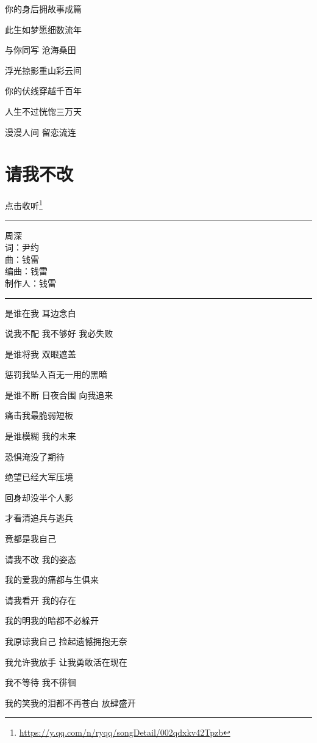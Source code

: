 \documentclass[]{ctexbook}
\renewcommand{\href}[2]{#2\footnote{\url{#1}}}
\begin{document}
你的身后拥故事成篇

此生如梦愿细数流年

与你同写 沧海桑田

浮光掠影重山彩云间

你的伏线穿越千百年

人生不过恍惚三万天

漫漫人间 留恋流连

\section*{请我不改}\label{brave-heart}


\href{https://y.qq.com/n/ryqq/songDetail/002qdxkv42Tpzb}{点击收听}

\begin{center}\rule{0.5\linewidth}{0.5pt}\end{center}

周深\\
词：尹约\\
曲：钱雷\\
编曲：钱雷\\
制作人：钱雷

\begin{center}\rule{0.5\linewidth}{0.5pt}\end{center}

是谁在我 耳边念白

说我不配 我不够好 我必失败

是谁将我 双眼遮盖

惩罚我坠入百无一用的黑暗

是谁不断 日夜合围 向我追来

痛击我最脆弱短板

是谁模糊 我的未来

恐惧淹没了期待

绝望已经大军压境

回身却没半个人影

才看清追兵与逃兵

竟都是我自己

请我不改 我的姿态

我的爱我的痛都与生俱来

请我看开 我的存在

我的明我的暗都不必躲开

我原谅我自己 捡起遗憾拥抱无奈

我允许我放手 让我勇敢活在现在

我不等待 我不徘徊

我的笑我的泪都不再苍白 放肆盛开
\end{document}
